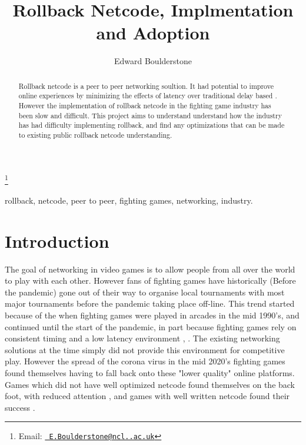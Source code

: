 \documentclass{entcs}
\begin{document}
\begin{frontmatter}
\title{Rollback Netcode, Implmentation and Adoption}
\author{Edward Boulderstone}
  \address{School of Computing Science, Newcastle University, UK} 
\thanks[nigellemail]{Email:
    \href{mailto:E.Boulderstone@ncl..ac.uk} {\texttt{\normalshape
        E.Boulderstone@ncl..ac.uk}}}

			
				
\begin{abstract} 
Rollback netcode is a peer to peer networking soultion. It had potential to improve online experiences by minimizing the effects of latency over traditional delay based . However the implementation of rollback netcode in the fighting game industry has been slow and difficult. This project aims to understand  understand how the industry has had difficulty implementing rollback, and find any optimizations that can be made to existing public rollback netcode understanding.
\end{abstract}

\begin{keyword}
rollback, netcode, peer to peer, fighting games, networking, industry.
\end{keyword}
\end{frontmatter}

\section{Introduction}\label{sec: introduction}
The goal of networking in video games is to allow people from all over the world to play with each other. However fans of fighting games have historically (Before the pandemic) gone out of their way to organise local tournaments with most major tournaments before the pandemic taking place off-line\cite{FGCMajors}. This trend started because of the when fighting games were played in arcades in the mid 1990's,\cite{FirstUSTournament} and continued until the start of the pandemic, in part because fighting games rely on consistent timing and a low latency environment \cite{DelayVsRollback}, \cite{BadNetcode}. The existing networking solutions at the time simply did not provide this environment for competitive play\cite{FGCAsEsport}. However the spread of the corona virus in the mid 2020's fighting games found themselves having to fall back onto these "lower quality" online platforms. Games which did not have well optimized netcode found themselves on the back foot, with reduced attention \cite{SmashTournamentsInThePandemic}, and games with well written netcode found their success  \cite{GuiltyGearStriveInThePandemic}.
\end{document}
